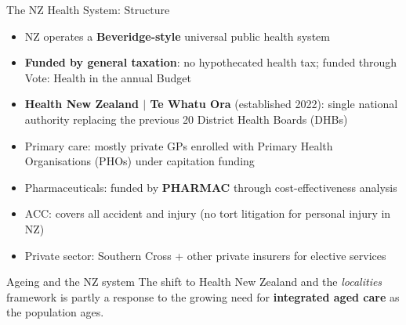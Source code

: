 \documentclass[aspectratio=169, 12pt]{beamer}
\begin{document}
\begin{frame}{The NZ Health System: Structure}
  \begin{itemize}
    \item NZ operates a \textbf{Beveridge-style} universal public health system
    \item \textbf{Funded by general taxation}: no hypothecated health tax; funded through
          Vote: Health in the annual Budget
    \item \textbf{Health New Zealand $|$ Te Whatu Ora} (established 2022): single national
          authority replacing the previous 20 District Health Boards (DHBs)
    \item Primary care: mostly private GPs enrolled with Primary Health Organisations (PHOs)
          under capitation funding
    \item Pharmaceuticals: funded by \textbf{PHARMAC} through cost-effectiveness analysis
    \item ACC: covers all accident and injury (no tort litigation for personal injury in NZ)
    \item Private sector: Southern Cross + other private insurers for elective services
  \end{itemize}
  \begin{alertblock}{Ageing and the NZ system}
    The shift to Health New Zealand and the \textit{localities} framework is partly a response
    to the growing need for \textbf{integrated aged care} as the population ages.
  \end{alertblock}
\end{frame}
\end{document}
